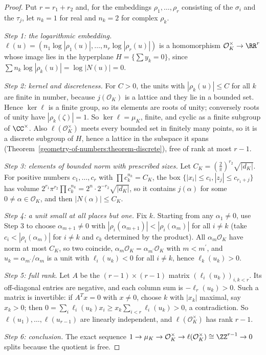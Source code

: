 \begin{proof}
Put $r = r_1 + r_2$ and, for the embeddings $\rho_1, \dots, \rho_r$ consisting of the $\sigma_i$ and the $\tau_j$, let $n_k = 1$ for real and $n_k = 2$ for complex $\rho_k$.

\emph{Step 1: the logarithmic embedding.} $\ell(u) = (n_1\log|\rho_1(u)|, \dots, n_r\log|\rho_r(u)|)$ is a homomorphism $\mathcal{O}_K^\times \to \RR^r$ whose image lies in the hyperplane
$H = \{\sum y_k = 0\}$, since $\sum n_k\log|\rho_k(u)| = \log|N(u)| = 0$.

\emph{Step 2: kernel and discreteness.} For $C > 0$, the units with $|\rho_k(u)| \leq C$ for all $k$ are finite in number, because $j(\mathcal{O}_K)$ is a lattice and they lie in a bounded set. Hence
$\ker\ell$ is a finite group, so its elements are roots of unity; conversely roots of unity have $|\rho_k(\zeta)| = 1$. So $\ker\ell = \mu_K$, finite, and cyclic as a finite subgroup of $\CC^\times$. Also $\ell(\mathcal{O}_K^\times)$
meets every bounded set in finitely many points, so it is a discrete subgroup of $H$, hence a lattice in the subspace it spans (Theorem~\ref{geometry-of-numbers:theorem-discrete}), free of rank at most $r - 1$.

\emph{Step 3: elements of bounded norm with prescribed sizes.} Let $C_K = (\frac2\pi)^{r_2}\sqrt{|d_K|}$. For positive numbers $c_1, \dots, c_r$ with $\prod c_k^{n_k} = C_K$, the box
$\{|x_i| \leq c_i, |z_j| \leq c_{r_1 + j}\}$ has volume $2^{r_1}\pi^{r_2}\prod c_k^{n_k} = 2^n \cdot 2^{-r_2}\sqrt{|d_K|}$, so it contains $j(\alpha)$ for some $0 \neq \alpha \in \mathcal{O}_K$, and then
$|N(\alpha)| \leq C_K$.

\emph{Step 4: a unit small at all places but one.} Fix $k$. Starting from any $\alpha_1 \neq 0$, use Step 3 to choose $\alpha_{m+1} \neq 0$ with $|\rho_i(\alpha_{m+1})| < |\rho_i(\alpha_m)|$ for all $i \neq k$
(take $c_i < |\rho_i(\alpha_m)|$ for $i \neq k$ and $c_k$ determined by the product). All $\alpha_m\mathcal{O}_K$ have norm at most $C_K$, so two coincide, $\alpha_m\mathcal{O}_K = \alpha_{m^{\prime}}\mathcal{O}_K$ with
$m < m^{\prime}$, and $u_k = \alpha_{m^{\prime}}/\alpha_m$ is a unit with $\ell_i(u_k) < 0$ for all $i \neq k$, hence $\ell_k(u_k) > 0$.

\emph{Step 5: full rank.} Let $A$ be the $(r - 1) \times (r - 1)$ matrix $(\ell_i(u_k))_{i, k < r}$. Its off-diagonal entries are negative, and each column sum is $-\ell_r(u_k) > 0$. Such a matrix is invertible:
if $A^Tx = 0$ with $x \neq 0$, choose $k$ with $|x_k|$ maximal, say $x_k > 0$; then $0 = \sum_i\ell_i(u_k)x_i \geq x_k\sum_{i < r}\ell_i(u_k) > 0$, a contradiction. So $\ell(u_1), \dots, \ell(u_{r-1})$ are
linearly independent, and $\ell(\mathcal{O}_K^\times)$ has rank $r - 1$.

\emph{Step 6: conclusion.} The exact sequence $1 \to \mu_K \to \mathcal{O}_K^\times \to \ell(\mathcal{O}_K^\times) \cong \ZZ^{r-1} \to 0$ splits because the quotient is free.
\end{proof}

